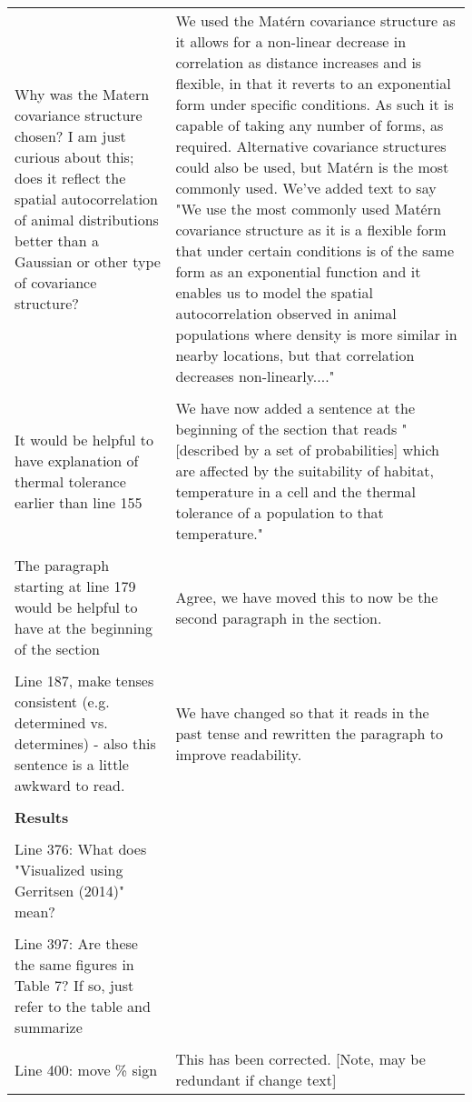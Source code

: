 \documentclass{article}
\begin{document}
\begin{landscape}
\begin{center}
\begin{longtable}{p{12cm} | p{12cm}}
\\
Why was the Matern covariance structure chosen? I am just curious about this;
does it reflect the spatial autocorrelation of animal distributions better than
a Gaussian or other type of covariance structure? & We used the Matérn
covariance structure as it allows for a non-linear decrease in correlation as
distance increases and is flexible, in that it reverts to an exponential form
under specific conditions. As such it is capable of taking any number of forms,
as required. Alternative covariance structures could also be used, but Matérn
is the most commonly used. We've added text to say "We use the most commonly
used Matérn covariance structure as it is a flexible form that under certain
conditions is of the same form as an exponential function and it enables us to
model the spatial autocorrelation observed in animal populations where density
is more similar in nearby locations, but that correlation decreases
non-linearly...." \\ 
\\
It would be helpful to have explanation of thermal tolerance earlier than line
155 & We have now added a sentence at the beginning of the section that reads
"[described by a set of probabilities] which are affected by the suitability of
habitat, temperature in a cell and the thermal tolerance of a population to
that temperature." \\
\\
The paragraph starting at line 179 would be helpful to have at the beginning of
the section & Agree, we have moved this to now be the second paragraph in the
section. \\
\\
Line 187, make tenses consistent (e.g. determined vs. determines) - also this
sentence is a little awkward to read. & We have changed so that it reads in the
past tense and rewritten the paragraph to improve readability. \\
\\
		\hline
		\textbf{Results} &  \\
\\
Line 376: What does "Visualized using Gerritsen (2014)" mean? & \\
\\
Line 397: Are these the same figures in Table 7? If so, just refer to the table
and summarize & \\
\\
Line 400: move \% sign & This has been corrected. [Note, may be redundant if
change text] \\

\end{longtable}
\end{center}
\end{landscape}
\end{document}
